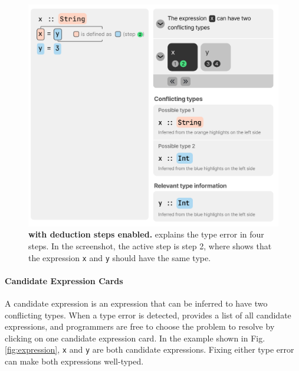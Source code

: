 \begin{figure}
    \centering
    \includegraphics[width=\linewidth, trim=0mm 10mm 0mm 0mm]{images/intro-deduction.pdf}
    \caption{
        \textbf{\chameleon{} with deduction steps enabled.}
        \chameleon{} explains the type error in four steps. In the screenshot, the active step is step 2, where \chameleon{} shows that the expression \texttt{x} and \texttt{y} should have the same type. 
    }
    \label{fig:deduction}
\end{figure}



\paragraph{Candidate Expression Cards}  \label{sub:candidate-expression}


A candidate expression is an expression that can be inferred to have two conflicting types. 
When a type error is detected, \chameleon{} provides a list of all candidate expressions, and programmers are free to choose the problem to resolve by clicking on one candidate expression card. In the example shown in Fig. \ref{fig:expression}, \texttt{x} and \texttt{y} are both candidate expressions. Fixing either type error can make both expressions well-typed.


